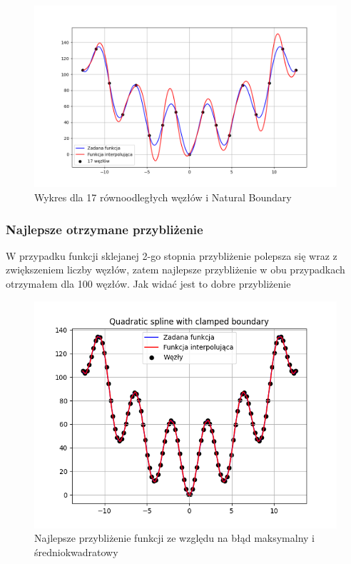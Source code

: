 \documentclass{article}
\begin{document}
\begin{figure}[H]
\centering
  \begin{minipage}[b]{0.49\textwidth}
    \includegraphics[width=\textwidth]{img19_n=17.png}
    \caption{Wykres dla 17 równoodległych węzłów i Natural Boundary}
  \end{minipage}
\end{figure}


\subsubsection{Najlepsze otrzymane przybliżenie}

W przypadku funkcji sklejanej 2-go stopnia przybliżenie polepsza się wraz z zwiększeniem liczby węzłów, zatem najlepsze przybliżenie w obu przypadkach otrzymałem dla 100 węzłów. Jak widać jest to dobre przybliżenie

\begin{figure}[H]
\centering
  \begin{minipage}[b]{0.49\textwidth}
    \includegraphics[width=\textwidth]{img21.png}
    \caption{Najlepsze przybliżenie funkcji ze względu na błąd maksymalny i średniokwadratowy}
  \end{minipage}
\end{figure}
\end{document}
